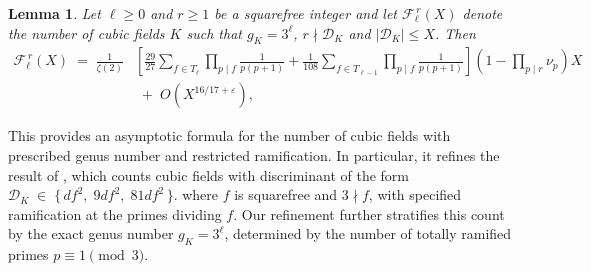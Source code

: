 \documentclass[11pt,reqno]{amsart}
\newcommand{\cD}{\mathcal{D}}
\newcommand{\cF}{\mathcal{F}}
\newtheorem{lemma}[theorem]{Lemma}
\theoremstyle{definition}
\theoremstyle{remark}
\begin{document}
\begin{lemma}\label{count-genus-number-S_3xC_2-lemma}
Let $\ell\geq 0$ and $r \geq 1$ be a squarefree integer and let $\cF_\ell^{\,r}(X)$ denote the number of cubic fields $K$ such that $g_K = 3^{\ell}$, $r \nmid \cD_K$ and $|\cD_K| \leq X$.
Then
\begin{align*}
    \cF_\ell^{\,r}(X) \;=\; \frac{1}{\zeta(2)} 
&\left[ \frac{29}{27} \sum_{f \in T_{\ell}} \prod_{p \mid f} \frac{1}{p(p+1)}
+ \frac{1}{108} \sum_{f \in T_{\ell-1}} \prod_{p \mid f} \frac{1}{p(p+1)} \right]
\left(1 - \prod_{p \mid r} \nu_p \right) X \\
&\;+\; O\!\left(X^{16/17 + \varepsilon}\right),
\end{align*}
\end{lemma}
\noindent
This provides an asymptotic formula for the number of cubic fields with prescribed genus number and restricted ramification. In particular, it refines the result of \cite[Section 5]{countingcubicfields}, which counts cubic fields with discriminant of the form   $\cD_K \;\in\; \{\, d f^2,\; 9d f^2,\; 81d f^2 \,\}$. where $f$ is squarefree and $3\nmid f$, with specified ramification at the primes dividing $f$. Our refinement further stratifies this count by the exact genus number $g_K = 3^{\ell}$, determined by the number of totally ramified primes $p \equiv 1 \pmod{3}$.
\end{document}
